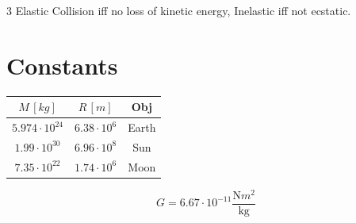 \documentclass[]{article}
\begin{document}
\begin{multicols}{3}
        Elastic Collision iff no loss of kinetic energy, Inelastic iff not ecstatic.  
        
        \section{Constants}
        \begin{center}
            \begin{tabular}{|c|c|c|}
                \hline $M \,[kg]$ & $R \,[m]$ & Obj \\
                \hline $5.974\cdot 10^{24}$ & $6.38\cdot 10^{6}$ &Earth \\
                \hline $1.99 \cdot 10^{30}$ & $6.96 \cdot 10^{8}$ & Sun \\
                \hline $7.35 \cdot 10^{22}$ & $1.74 \cdot 10^{6}$ & Moon \\
                \hline
            \end{tabular}
        \end{center}
        \[ G = 6.67 \cdot 10^{-11} \frac{\mathrm{N}m^2}{\mathrm{kg}} \]
	\end{multicols}
	\pagebreak
\end{document}
